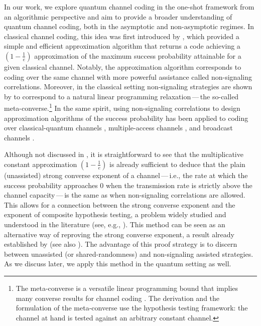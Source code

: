 \documentclass[a4paper,onecolumn,11pt,accepted=2025-10-01]{quantumarticle}
\begin{document}
In our work, we explore quantum channel coding in the one-shot framework from an algorithmic perspective and aim to provide a broader understanding of quantum channel coding, both in the asymptotic and non-asymptotic regimes. In classical channel coding, this idea was first introduced by \cite{barman2017algorithmic},   which provided a simple and efficient approximation algorithm that returns a code achieving a $(1 - \frac{1}{e})$ approximation of the maximum success probability attainable for a given classical channel. Notably, the approximation algorithm corresponds to coding over the same channel with more powerful assistance called non-signaling correlations. Moreover, in the classical setting non-signaling strategies are shown by \cite{matthews2012linear} to correspond to  a natural linear programming relaxation\,---\,the so-called meta-converse.\footnote{The meta-converse is a versatile linear programming bound that implies many converse results for channel coding \cite{polyanskiy2010channel}. The derivation and the formulation of the meta-converse use the hypothesis testing framework: the channel at hand is tested against an arbitrary constant channel.} In the same spirit, using non-signaling correlations to design approximation algorithms of the success probability has been applied to coding over classical-quantum channels \cite{Fawzi19},  multiple-access channels \cite{fawzi2023multiple}, and broadcast channels \cite{fawzi2023broadcast}.

Although not discussed in \cite{barman2017algorithmic}, it is straightforward to see that the multiplicative constant approximation $(1 - \frac{1}{e})$ is already sufficient to deduce that the plain (unassisted) strong converse exponent of a channel\,---\,i.e., the rate at which the success probability approaches $0$ when the transmission rate is strictly above the channel capacity\,---\,is the same as when non-signaling correlations are allowed. This allows for a connection between the strong converse exponent and the  exponent of  composite hypothesis testing, a problem widely studied and understood in the literature (see, e.g., \cite{Hayashi2016Oct}). This method can be seen as an alternative way of reproving the strong converse exponent, a result already established by \cite{Arimoto1973May,imre} (see also \cite{polyanskiy2010arimoto}). The advantage of this proof strategy is to discern between unassisted (or shared-randomness) and non-signaling assisted strategies. As we discuss later, we apply this method in the quantum setting as well.
\end{document}
